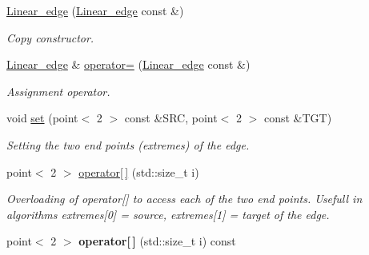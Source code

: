 \begin{DoxyCompactItemize}
\item 
\hypertarget{classGeometry_1_1Linear__edge_af3a8b762ff05d8db1a3c976e2985ebb2}{
\hyperlink{classGeometry_1_1Linear__edge_af3a8b762ff05d8db1a3c976e2985ebb2}{Linear\_\-edge} (\hyperlink{classGeometry_1_1Linear__edge}{Linear\_\-edge} const \&)}
\label{classGeometry_1_1Linear__edge_af3a8b762ff05d8db1a3c976e2985ebb2}

\begin{DoxyCompactList}\small\item\em Copy constructor. \item\end{DoxyCompactList}\item 
\hypertarget{classGeometry_1_1Linear__edge_ab1cab14e36cf0e1d51bc68dea4c736a3}{
\hyperlink{classGeometry_1_1Linear__edge}{Linear\_\-edge} \& \hyperlink{classGeometry_1_1Linear__edge_ab1cab14e36cf0e1d51bc68dea4c736a3}{operator=} (\hyperlink{classGeometry_1_1Linear__edge}{Linear\_\-edge} const \&)}
\label{classGeometry_1_1Linear__edge_ab1cab14e36cf0e1d51bc68dea4c736a3}

\begin{DoxyCompactList}\small\item\em Assignment operator. \item\end{DoxyCompactList}\item 
\hypertarget{classGeometry_1_1Linear__edge_a567dadf0feb7d130903b7d2aaebfdf08}{
void \hyperlink{classGeometry_1_1Linear__edge_a567dadf0feb7d130903b7d2aaebfdf08}{set} (point$<$ 2 $>$ const \&SRC, point$<$ 2 $>$ const \&TGT)}
\label{classGeometry_1_1Linear__edge_a567dadf0feb7d130903b7d2aaebfdf08}

\begin{DoxyCompactList}\small\item\em Setting the two end points (extremes) of the edge. \item\end{DoxyCompactList}\item 
\hypertarget{classGeometry_1_1Linear__edge_a93a04309b0e46c40eb803a60d213a527}{
point$<$ 2 $>$ \hyperlink{classGeometry_1_1Linear__edge_a93a04309b0e46c40eb803a60d213a527}{operator\mbox{[}$\,$\mbox{]}} (std::size\_\-t i)}
\label{classGeometry_1_1Linear__edge_a93a04309b0e46c40eb803a60d213a527}

\begin{DoxyCompactList}\small\item\em Overloading of operator\mbox{[}\mbox{]} to access each of the two end points. Usefull in algorithms  extremes\mbox{[}0\mbox{]} = source, extremes\mbox{[}1\mbox{]} = target of the edge. \item\end{DoxyCompactList}\item 
\hypertarget{classGeometry_1_1Linear__edge_ab575249c0388c9c335b3d121d98f27b3}{
point$<$ 2 $>$ {\bfseries operator\mbox{[}$\,$\mbox{]}} (std::size\_\-t i) const }
\label{classGeometry_1_1Linear__edge_ab575249c0388c9c335b3d121d98f27b3}

\end{DoxyCompactItemize}


